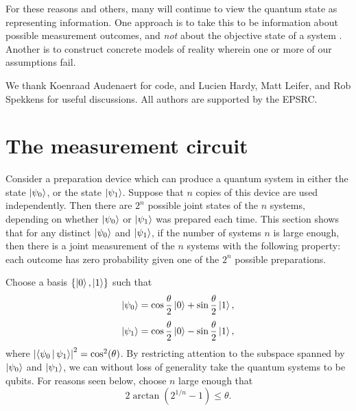 \documentclass[amsmath,amssymb,superscriptaddress,pra,12pt]{revtex4-1}
\newcommand{\abs}[1]{\left\lvert{#1}\right\rvert}
\begin{document}
For these reasons and others, many will continue to view the quantum state as representing information. One approach is to take this to be information about possible measurement outcomes, and \emph{not} about the objective state of a system \cite{QUBISM}. Another is to construct concrete models of reality wherein one or more of our assumptions fail.

\begin{acknowledgments}
We thank Koenraad Audenaert for code, and Lucien Hardy, Matt Leifer, and Rob Spekkens for useful discussions. All authors are supported by the EPSRC.
\end{acknowledgments}



\appendix
\section{The measurement circuit}\label{eqnsol}

Consider a preparation device which can produce a quantum system in either the state $\ket{\psi_0}$, or the state $\ket{\psi_1}$. Suppose that $n$ copies of this device are used independently. Then there are $2^n$ possible joint states of the $n$ systems, depending on whether $\ket{\psi_0}$ or $\ket{\psi_1}$ was prepared each time. This section shows that for any distinct $\ket{\psi_0}$ and $\ket{\psi_1}$, if the number of systems $n$ is large enough, then there is a joint measurement of the $n$ systems with the following property:  each outcome has zero probability given one of the $2^n$ possible preparations.

Choose a basis  $\{\ket{0},\ket{1}\}$ such that 
\begin{equation}
\ket{\psi_0} = \cos\frac\theta2\ket0 + \sin\frac\theta2\ket1,
\end{equation}
\begin{equation}
  \ket{\psi_1} = \cos\frac\theta2\ket0 - \sin\frac\theta2\ket1,
\end{equation}
where $\abs{\Braket{\psi_0|\psi_1}}^2 = \cos^2(\theta)$. By restricting attention to the subspace spanned by $\ket{\psi_0}$ and $\ket{\psi_1}$, we can without loss of generality take the quantum systems to be qubits. For reasons seen below, choose $n$ large enough that
\begin{equation}
2\arctan\left(2^{1/n} - 1\right) \leq \theta.  \label{ppreq}
\end{equation}

\end{document}
